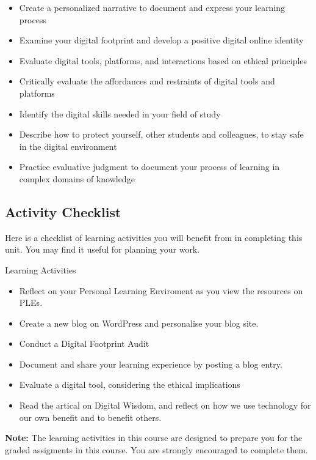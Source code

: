 \documentclass[
]{book}
\providecommand{\tightlist}{%
  \setlength{\itemsep}{0pt}\setlength{\parskip}{0pt}}
\theoremstyle{definition}
\theoremstyle{definition}
\theoremstyle{definition}
\theoremstyle{definition}
\theoremstyle{remark}
\begin{document}
\begin{itemize}
\tightlist
\item
  Create a personalized narrative to document and express your learning process\\
\item
  Examine your digital footprint and develop a positive digital online identity\\
\item
  Evaluate digital tools, platforms, and interactions based on ethical principles\\
\item
  Critically evaluate the affordances and restraints of digital tools and platforms\\
\item
  Identify the digital skills needed in your field of study\\
\item
  Describe how to protect yourself, other students and colleagues, to stay safe in the digital environment\\
\item
  Practice evaluative judgment to document your process of learning in complex domains of knowledge
\end{itemize}

\hypertarget{activity-checklist-3}{%
\subsection*{Activity Checklist}\label{activity-checklist-3}}

Here is a checklist of learning activities you will benefit from in completing this unit. You may find it useful for planning your work.

\begin{reflect}
{Learning Activities}

\begin{itemize}
\tightlist
\item
  Reflect on your Personal Learning Enviroment as you view the resources on PLEs.\\
\item
  Create a new blog on WordPress and personalise your blog site.\\
\item
  Conduct a Digital Footprint Audit\\
\item
  Document and share your learning experience by posting a blog entry.\\
\item
  Evaluate a digital tool, considering the ethical implications\\
\item
  Read the artical on Digital Wisdom, and reflect on how we use technology for our own benefit and to benefit others.
\end{itemize}

\textbf{Note:} The learning activities in this course are designed to prepare you for the graded assigments in this course. You are strongly encouraged to complete them.
\end{reflect}
\end{document}
